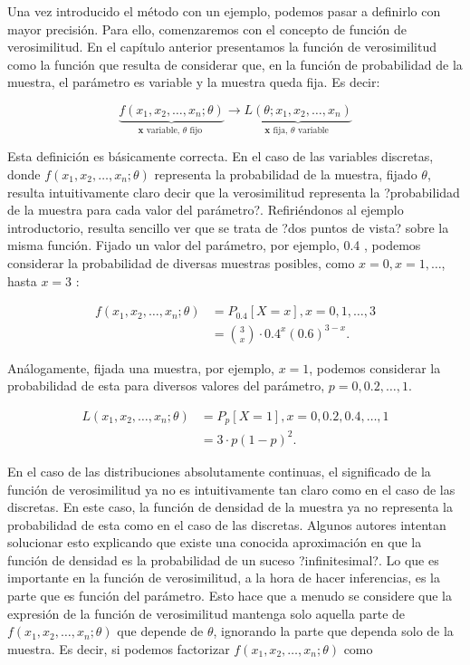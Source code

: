 \documentclass[
]{article}
\begin{document}
Una vez introducido el método con un ejemplo, podemos pasar a definirlo con mayor precisión. Para ello, comenzaremos con el concepto de función de verosimilitud.
En el capítulo anterior presentamos la función de verosimilitud como la función que resulta de considerar que, en la función de probabilidad de la muestra, el parámetro es variable y la muestra queda fija. Es decir:

\[
\underbrace{f\left(x_{1}, x_{2}, \ldots, x_{n} ; \theta\right)}_{\mathbf{x} \text { variable, } \theta \text { fijo }} \longrightarrow \underbrace{L\left(\theta ; x_{1}, x_{2}, \ldots, x_{n}\right)}_{\mathbf{x} \text { fija, } \theta \text { variable }}
\]

Esta definición es básicamente correcta. En el caso de las variables discretas, donde \(f\left(x_{1}, x_{2}, \ldots, x_{n} ; \theta\right)\) representa la probabilidad de la muestra, fijado \(\theta\), resulta intuitivamente claro decir que la verosimilitud representa la ?probabilidad de la muestra para cada valor del parámetro?.
Refiriéndonos al ejemplo introductorio, resulta sencillo ver que se trata de ?dos puntos de vista? sobre la misma función. Fijado un valor del parámetro, por ejemplo, 0.4 , podemos considerar la probabilidad de diversas muestras posibles, como \(x=0, x=1, \ldots\), hasta \(x=3\) :

\[
\begin{aligned}
f\left(x_{1}, x_{2}, \ldots, x_{n} ; \theta\right) & =P_{0.4}[X=x], x=0,1, \ldots, 3 \\
& =\binom{3}{x} \cdot 0.4^{x}(0.6)^{3-x} .
\end{aligned}
\]

Análogamente, fijada una muestra, por ejemplo, \(x=1\), podemos considerar la probabilidad de esta para diversos valores del parámetro, \(p=0,0.2, \ldots, 1\).

\[
\begin{aligned}
L\left(x_{1}, x_{2}, \ldots, x_{n} ; \theta\right) & =P_{p}[X=1], x=0,0.2,0.4, \ldots, 1 \\
& =3 \cdot p(1-p)^{2} .
\end{aligned}
\]

En el caso de las distribuciones absolutamente continuas, el significado de la función de verosimilitud ya no es intuitivamente tan claro como en el caso de las discretas. En este caso, la función de densidad de la muestra ya no representa la probabilidad de esta como en el caso de las discretas. Algunos autores intentan solucionar esto explicando que existe una conocida aproximación en que la función de densidad es la probabilidad de un suceso ?infinitesimal?.
Lo que es importante en la función de verosimilitud, a la hora de hacer inferencias, es la parte que es función del parámetro. Esto hace que a menudo se considere que la expresión de la función de verosimilitud mantenga solo aquella parte de \(f\left(x_{1}, x_{2}, \ldots, x_{n} ; \theta\right)\) que depende de \(\theta\), ignorando la parte que dependa solo de la muestra. Es decir, si podemos factorizar \(f\left(x_{1}, x_{2}, \ldots, x_{n} ; \theta\right)\) como
\end{document}
